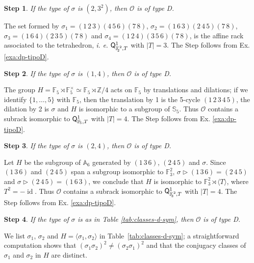 \documentclass[11pt]{amsart} \textheight 22cm
\renewcommand{\^}[1]{\mbox{$^{\left( #1 \right)}$}}
\renewcommand{\_}[1]{\mbox{$_{\left( #1 \right)}$}}
\newcommand{\trid}{\triangleright}
\newcommand{\Z}{{\mathbb Z}}
\newcommand{\Q}{{\mathsf Q}}
\newcommand{\F}{{\mathbb F}}
\newcommand{\oc}{{\mathcal O}}
\theoremstyle{plain}
\newtheorem{step}{Step}
\theoremstyle{definition}
\theoremstyle{remark}
\newcommand\id{\operatorname{id}}
\newcommand\sco{\mathbb S_5}
\newcommand\as{\mathbb A_6}
\theoremstyle{remark}
\begin{document}
\begin{step}\label{step:2-3^2} If the type of $\sigma$ is $(2,3^2)$,
then $\oc$ is of type D. \end{step}




The set formed by $\sigma_{1}
=(1\,2\,3)(4\,5\,6)(7\,8)$, $\sigma_{2}=(1\,6\,3)(2\,4\,5)(7\,8)$,
$\sigma_{3}=(1\,6\,4)(2\,3\,5)(7\,8)$ and
$\sigma_{4}=(1\,2\,4)(3\,5\,6)(7\,8)$, is the affine rack
associated to the tetrahedron, \emph{i. e.}
$\Q^1_{\F_{\hspace{-2pt}2}^{\, 2},T}$ with $\vert T \vert = 3$.
The Step follows from Ex. \ref{exa:dp-tipoD}.


\begin{step}\label{step:1-4} If the type of $\sigma$ is $(1,4)$, then $\oc$ is of type D. \end{step}

The group $H = \F_5 \rtimes \F_5^{\times}\simeq \F_5 \rtimes \Z/4$
acts on $\F_5$ by translations and dilations; if we identify $\{1,
\dots, 5\}$ with $\F_5$, then the translation by 1 is the 5-cycle
$(1\,2\,3\,4\,5)$,  the dilation by 2 is $\sigma$ and $H$ is
isomorphic to a subgroup of $\sco$. Thus $\oc$ contains a subrack isomorphic to
$\Q^1_{\F_{\hspace{-1pt}5},T}$ with $\vert T \vert = 4$.
The Step follows from Ex. \ref{exa:dp-tipoD}.

\begin{step}\label{step:2-4} If the type of $\sigma$ is $(2,4)$, then $\oc$ is of type D. \end{step}

Let $H$ be the subgroup of $\as$ generated by $(1\,3\,6)$,
$(2\,4\,5)$ and $\sigma$. Since $(1\,3\,6)$ and $(2\,4\,5)$ span a
subgroup isomorphic to $\F_3^2$, $\sigma \trid (1\,3\,6) =
(2\,4\,5)$ and $\sigma \trid (2\,4\,5) = (1\,6\,3)$, we conclude
that $H$ is isomorphic to $\F_3^2\rtimes \langle T\rangle$, where
$T^2 = -\id$. Thus $\oc$ contains a subrack isomorphic to
$\Q^1_{\F_{\hspace{-2pt}3}^{\, 2},T}$ with $\vert T \vert = 4$.
The Step follows from Ex. \ref{exa:dp-tipoD}.






\begin{step}\label{step:small} If the type of $\sigma$ is as in Table \ref{tab:classes-d-sym},
then $\oc$ is of type D.
\end{step}


We list $\sigma_1$, $\sigma_2$ and
$H=\langle\sigma_{1},\sigma_{2}\rangle$ in
Table~\ref{tab:classes-d-sym}; a straightforward computation shows
that $(\sigma_1 \sigma_2)^2 \neq (\sigma_2 \sigma_1)^2$ and that
the conjugacy classes of $\sigma_1$ and $\sigma_2$ in $H$ are
distinct.
\end{document}
